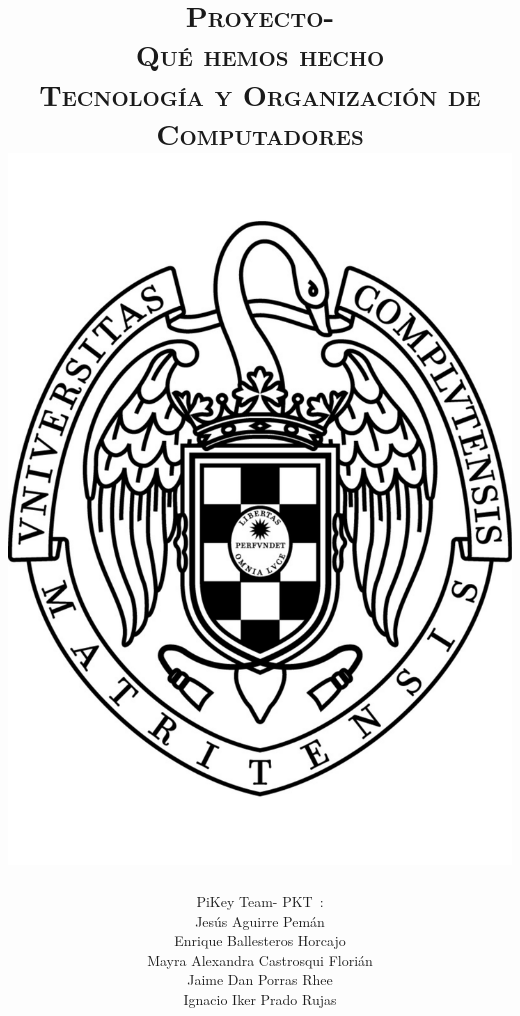 \documentclass[11pt, a4paper, spanish, openright, twoside]{book}
\newcommand*{\PKT}{\hbox{P}\kern-2.5pt\lower3.5pt\hbox{\small{K}}\kern-2.8pt\hbox{T}\kern-2pt}	%
\begin{document}
 
\title{\Huge{\textsc{Proyecto-\\
	Qué hemos hecho}} \\
	\vspace{0.7cm}
	 \textsc{\Large{Tecnología y Organización de Computadores}} \\
	\includegraphics[scale=0.3]{ucm.pdf}}
\author{{\Large{PiKey Team-}} \PKT \ : \vspace{0.2cm} \\
	Jesús Aguirre Pemán \\
	 Enrique Ballesteros Horcajo \\
	 Mayra Alexandra Castrosqui Florián\\
	 Jaime Dan Porras Rhee \\
	 Ignacio Iker Prado Rujas}
\date{\Today}
\maketitle
\end{document}
